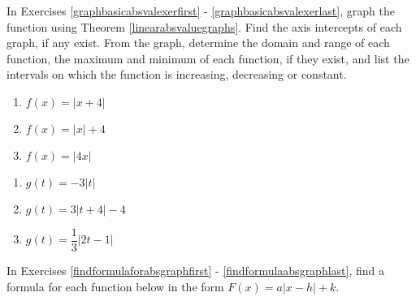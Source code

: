 In Exercises \ref{graphbasicabsvalexerfirst} - \ref{graphbasicabsvalexerlast}, graph the function using Theorem \ref{linearabsvaluegraphs}. Find the axis intercepts of each graph, if any exist.  From the graph, determine the domain and range of each function, the maximum and minimum of each function, if they exist, and list the intervals on which the function is increasing, decreasing or constant.

\begin{multicols}{3}
\begin{enumerate}

\item $f(x) = |x + 4|$ \label{graphbasicabsvalexerfirst}
\item $f(x) = |x| + 4$
\item $f(x) = |4x|$


\setcounter{HW}{\value{enumi}}
\end{enumerate}
\end{multicols}

\begin{multicols}{3}
\begin{enumerate}
\setcounter{enumi}{\value{HW}}

\item $g(t) = -3|t|$ 
\item $g(t) = 3|t + 4| - 4$ 
\item $g(t) = \dfrac{1}{3}|2t - 1|$ \label{graphbasicabsvalexerlast}

\setcounter{HW}{\value{enumi}}
\end{enumerate}
\end{multicols}


In Exercises \ref{findformulaforabsgraphfirst} - \ref{findformulaabsgraphlast}, find a formula for each function below in the form $F(x) = a|x-h|+k$.

